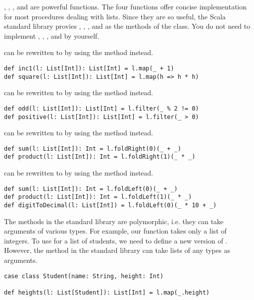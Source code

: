 , , , and
 are powerful functions. The four functions offer concise
implementation for most procedures dealing with lists.
Since they are so useful, the Scala standard library provies ,
, , and  as the methods of the
 class. You do not need to implement ,
, , and  by yourself.

 can be rewritten to  by using the 
method instead.

\begin{verbatim}
def inc1(l: List[Int]): List[Int] = l.map(_ + 1)
def square(l: List[Int]): List[Int] = l.map(h => h * h)
\end{verbatim}

 can be rewritten to  by using the
 method instead.

\begin{verbatim}
def odd(l: List[Int]): List[Int] = l.filter(_ % 2 != 0)
def positive(l: List[Int]): List[Int] = l.filter(_ > 0)
\end{verbatim}

 can be rewritten to  by using the
 method instead.

\begin{verbatim}
def sum(l: List[Int]): Int = l.foldRight(0)(_ + _)
def product(l: List[Int]): Int = l.foldRight(1)(_ * _)
\end{verbatim}

 can be rewritten to  by using the
 method instead.

\begin{verbatim}
def sum(l: List[Int]): Int = l.foldLeft(0)(_ + _)
def product(l: List[Int]): Int = l.foldLeft(1)(_ * _)
def digitToDecimal(l: List[Int]) = l.foldLeft(0)(_ * 10 + _)
\end{verbatim}

The methods in the standard library are polymorphic, i.e. they can take
arguments of various types. For example, our  function takes only a
list of integers. To use  for a list of students, we need to define a
new version of . However, the  method in the standard
library can take lists of any types as arguments.

\begin{verbatim}
case class Student(name: String, height: Int)

def heights(l: List[Student]): List[Int] = l.map(_.height)
\end{verbatim}

